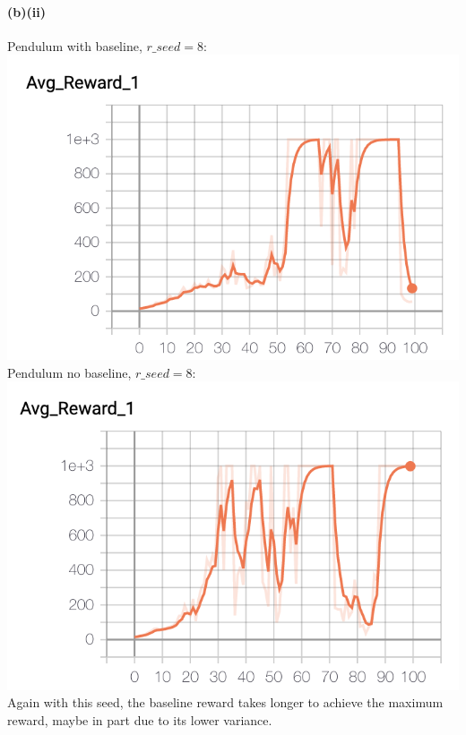 \documentclass[10pt,a4paper]{article}
\begin{document}
  \paragraph{(b)(ii)}    
  Pendulum with baseline, $r\_seed=8$: \\
  \includegraphics[scale=0.5]{images/pendulum_baseline_8_avg_reward.png} \\
  Pendulum no baseline, $r\_seed=8$: \\
  \includegraphics[scale=0.5]{images/pendulum_nobaseline_8_avg_reward.png} \\
  Again with this seed, the baseline reward takes longer to achieve the maximum reward, maybe in part due to its lower variance.
\end{document}
